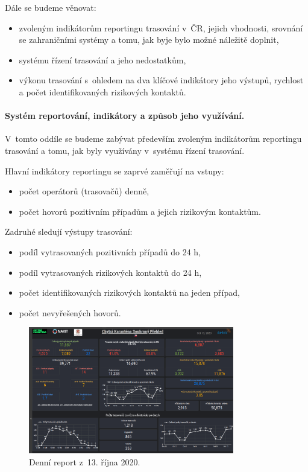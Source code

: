 Dále se budeme věnovat:
\begin{itemize}
\item zvoleným indikátorům reportingu trasování v~ČR, jejich vhodnosti, srovnání se zahraničními systémy a tomu, jak byje  bylo možné náležitě doplnit,
\item systému řízení trasování a jeho nedostatkům,
\item výkonu trasování s~ohledem na dva klíčové indikátory jeho výstupů, rychlost a počet identifikovaných rizikových kontaktů.
\end{itemize}


\paragraph{Systém reportování, indikátory a způsob jeho využívání.} V~tomto oddíle se budeme zabývat především zvoleným indikátorům reportingu trasování a tomu, jak byly využívány v~systému řízení trasování.

Hlavní indikátory reportingu se zaprvé zaměřují na vstupy:
\begin{itemize}
\item počet operátorů (trasovačů) denně,
\item počet hovorů pozitivním případům a jejich rizikovým kontaktům.
\end{itemize}

Zadruhé sledují výstupy trasování:
\begin{itemize}
\item podíl vytrasovaných pozitivních případů do 24 h,
\item podíl vytrasovaných rizikových kontaktů do 24 h,
\item počet identifikovaných rizikových kontaktů na jeden případ,
\item počet nevyřešených hovorů.
\end{itemize}

\begin{figure}[ht]
    \centering
    \includegraphics[width=0.8\textwidth]{./pic/daktela.jpg}
    \caption{Denní report z~13. října 2020.}
    \label{fig:daktela}
\end{figure}



